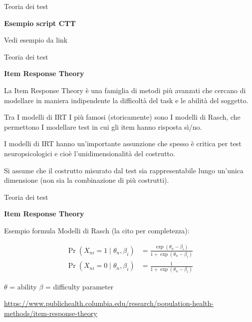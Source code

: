 \documentclass[
  ignorenonframetext,
]{beamer}
\begin{document}
\begin{frame}{Teoria dei test}
\label{teoria-dei-test-3}
\begin{center}
  \textbf{Esempio script CTT}
\end{center}

Vedi esempio da link
\end{frame}

\begin{frame}{Teoria dei test}
\label{teoria-dei-test-4}
\begin{center}
  \textbf{Item Response Theory}
\end{center}

La Item Response Theory è una famiglia di metodi più avanzati che
cercano di modellare in maniera indipendente la difficoltà del task e le
abilità del soggetto.

Tra I modelli di IRT I più famosi (storicamente) sono I modelli di
Rasch, che permettono I modellare test in cui gli item hanno risposta
sì/no. \pause

I modelli di IRT hanno un'importante assunzione che spesso è critica per
test neuropsicologici e cioè l'unidimensionalità del costrutto. \pause

Si assume che il costrutto misurato dal test sia rappresentabile lungo
un'unica dimensione (non sia la combinazione di più costrutti).
\end{frame}

\begin{frame}{Teoria dei test}
\label{teoria-dei-test-5}
\begin{center}
  \textbf{Item Response Theory}
\end{center}

Esempio formula Modelli di Rasch (la cito per completezza): \vspace{2em}

\small
\begin{align}
  \Pr(X_{ni}=1 \mid \theta_n, \beta_i)
  &= \frac{\exp(\theta_n - \beta_i)}{1 + \exp(\theta_n - \beta_i)}
  \label{eq:rasch_prob}
  \\
  \Pr(X_{ni}=0 \mid \theta_n, \beta_i) &= \frac{1}{1 + \exp(\theta_n - \beta_i)}
  \label{eq:rasch_prob0}
\end{align}

$\theta$ = ability
$\beta$ = difficulty parameter

\vspace{2em}

\href{https://www.publichealth.columbia.edu/research/population-health-methods/item-response-theory}{\ul{https://www.publichealth.columbia.edu/research/population-health-methods/item-response-theory}}
\end{frame}
\end{document}
